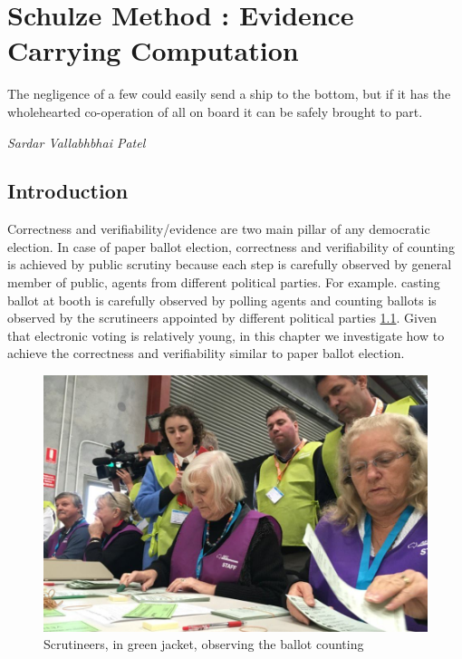 \chapter{Schulze Method : Evidence Carrying Computation}
\label{cha:schulze_method}

\epigraph{The negligence of a few could easily send a ship to the bottom, but if it has the wholehearted 
co-operation of all on board it can be safely brought to part.} 
{\textit{Sardar Vallabhbhai Patel}} 

\section{Introduction}
 Correctness and verifiability/evidence are two main pillar of any democratic election. 
 In case of paper ballot election, correctness and verifiability of counting is achieved 
 by public scrutiny because each step is carefully observed by general member of public, 
 agents from different political parties. For example. casting ballot at booth 
 is carefully observed by polling agents and 
 counting ballots is observed by the scrutineers appointed by different political parties \ref{fig:scrutineers}.
 Given that electronic voting is relatively young, in this chapter we investigate 
 how to achieve the correctness and verifiability similar to paper ballot election.
 
\begin{figure}[h!]
 \centering
  \includegraphics[width=1\linewidth]{figs/scrutineers.jpg}
  \caption{Scrutineers, in green jacket, observing the ballot counting}
  \label{fig:scrutineers}
  \end{figure} 
 
